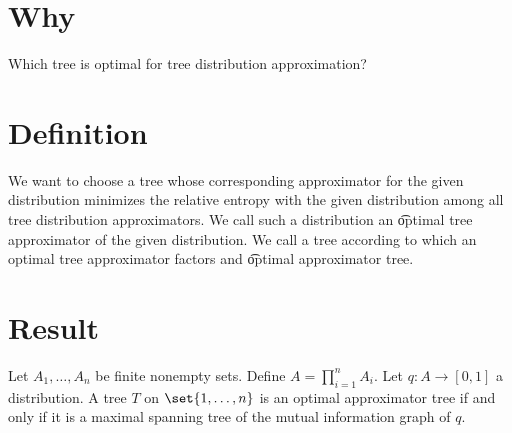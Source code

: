 

\section*{Why}

Which tree is optimal for tree distribution approximation?

\section*{Definition}

We want to choose a tree whose corresponding approximator for the given distribution minimizes the relative entropy with the given distribution among all tree distribution approximators.
We call such a distribution an \t{optimal} tree approximator of the given distribution.
We call a tree according to which an optimal tree approximator factors and \t{optimal} approximator tree.

\section*{Result}

\begin{proposition}

\label{prop:optimaltreeapproximators}Let $A_1, \dots , A_n$ be finite nonempty sets.
Define $A = \prod_{i = 1}^{n} A_i$.
Let $q: A \to [0, 1]$ a distribution.
A tree $T$ on $\set{1, \dots , n}$ is an optimal approximator tree if and only if it is a maximal spanning tree of the mutual information graph of $q$.

\end{proposition}

